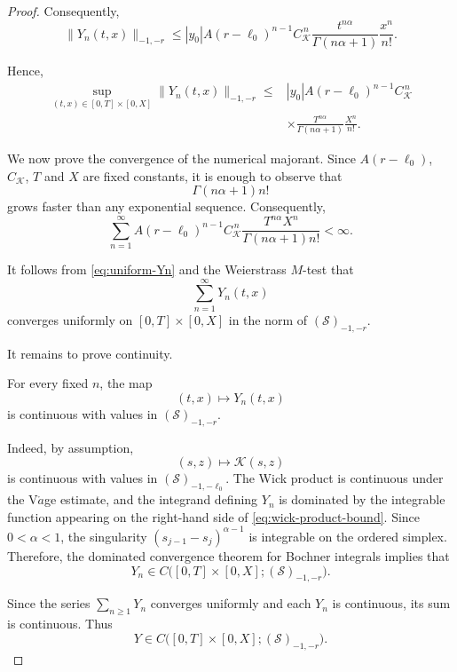 \documentclass[10pt,a4paper]{amsart}
\begin{document}
\begin{proof}
Consequently,
\begin{equation}
\boxed{
\|Y_n(t,x)\|_{-1,-r}
\leq
|y_0|
A(r-\ell_0)^{n-1}
C_{\mathcal K}^{\,n}
\frac{t^{n\alpha}}
{\Gamma(n\alpha+1)}
\frac{x^n}{n!}.
}
\label{eq:Yn-final-bound}
\end{equation}

Hence,
\begin{equation}
\begin{aligned}
\sup_{(t,x)\in[0,T]\times[0,X]}
\|Y_n(t,x)\|_{-1,-r}
\leq{}&
|y_0|
A(r-\ell_0)^{n-1}
C_{\mathcal K}^{\,n}
\\
&\times
\frac{T^{n\alpha}}
{\Gamma(n\alpha+1)}
\frac{X^n}{n!}.
\end{aligned}
\label{eq:uniform-Yn}
\end{equation}

We now prove the convergence of the numerical majorant. Since
$A(r-\ell_0)$, $C_{\mathcal K}$, $T$ and $X$ are fixed constants, it is enough to observe that
\[
\Gamma(n\alpha+1)n!
\]
grows faster than any exponential sequence. Consequently,
\begin{equation}
\sum_{n=1}^{\infty}
A(r-\ell_0)^{n-1}
C_{\mathcal K}^{\,n}
\frac{T^{n\alpha}X^n}
{\Gamma(n\alpha+1)n!}
<\infty.
\label{eq:majorant-convergence}
\end{equation}

It follows from \eqref{eq:uniform-Yn} and the Weierstrass
$M$-test that
\begin{equation}
\sum_{n=1}^{\infty}Y_n(t,x)
\end{equation}
converges uniformly on $[0,T]\times[0,X]$ in the norm of
$(\mathcal S)_{-1,-r}$.

It remains to prove continuity.

For every fixed $n$, the map
\[
(t,x)\longmapsto Y_n(t,x)
\]
is continuous with values in $(\mathcal S)_{-1,-r}$.

Indeed, by assumption,
\[
(s,z)\longmapsto\mathcal K(s,z)
\]
is continuous with values in $(\mathcal S)_{-1,-\ell_0}$.
The Wick product is continuous under the V$\mathring{a}$ge estimate, and the
integrand defining $Y_n$ is dominated by the integrable function
appearing on the right-hand side of \eqref{eq:wick-product-bound}.
Since $0<\alpha<1$, the singularity
$(s_{j-1}-s_j)^{\alpha-1}$ is integrable on the ordered simplex.
Therefore, the dominated convergence theorem for Bochner integrals
implies that
\[
Y_n\in
C\big([0,T]\times[0,X];(\mathcal S)_{-1,-r}\big).
\]

Since the series $\sum_{n\geq1}Y_n$ converges uniformly and each
$Y_n$ is continuous, its sum is continuous. Thus
\begin{equation}
\boxed{
Y\in
C\big([0,T]\times[0,X];(\mathcal S)_{-1,-r}\big).
}
\label{eq:Y-continuity}
\end{equation}


\end{proof}
\end{document}
